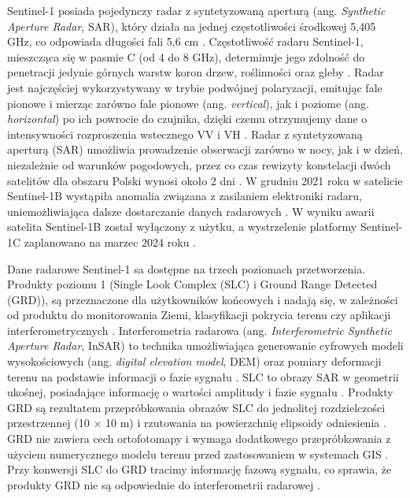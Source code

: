 \documentclass{amuthesis}
\begin{document}
Sentinel-1 posiada pojedynczy radar z syntetyzowaną aperturą (ang.
\emph{Synthetic Aperture Radar}, SAR), który działa na jednej
częstotliwości środkowej 5,405 GHz, co odpowiada długości fali 5,6 cm
\autocite{sentinel1_lulc,sentinel1_instrument_payload}. Częstotliwość
radaru Sentinel-1, mieszcząca się w pasmie C (od 4 do 8 GHz),
determinuje jego zdolność do penetracji jedynie górnych warstw koron
drzew, roślinności oraz gleby \autocite{sentinel_1_user_guide}. Radar
jest najczęściej wykorzystywany w trybie podwójnej polaryzacji, emitując
fale pionowe i mierząc zarówno fale pionowe (ang. \emph{vertical}), jak
i poziome (ang. \emph{horizontal}) po ich powrocie do czujnika, dzięki
czemu otrzymujemy dane o intensywności rozproszenia wstecznego VV i VH
\autocite{sentinel1_lulc}. Radar z syntetyzowaną aperturą (SAR)
umożliwia prowadzenie obserwacji zarówno w nocy, jak i w dzień,
niezależnie od warunków pogodowych, przez co czas rewizyty konstelacji
dwóch satelitów dla obszaru Polski wynosi około 2 dni
\autocite{attema_2008_s1,sentinel1_revisit}. W grudniu 2021 roku w
satelicie Sentinel-1B wystąpiła anomalia związana z zasilaniem
elektroniki radaru, uniemożliwiająca dalsze dostarczanie danych
radarowych \autocite{sentinel_1b}. W wyniku awarii satelita Sentinel-1B
został wyłączony z użytku, a wystrzelenie platformy Sentinel-1C
zaplanowano na marzec 2024 roku
\autocite{sentinel_1b,sentinel1_eoportal}.

Dane radarowe Sentinel-1 sa dostępne na trzech poziomach przetworzenia.
Produkty poziomu 1 (Single Look Complex (SLC) i Ground Range Detected
(GRD)), są przeznaczone dla użytkowników końcowych i nadają się, w
zależności od produktu do monitorowania Ziemi, klasyfikacji pokrycia
terenu czy aplikacji interferometrycznych
\autocite{hejmanowska_2020_dane}. Interferometria radarowa (ang.
\emph{Interferometric Synthetic Aperture Radar}, InSAR) to technika
umożliwiająca generowanie cyfrowych modeli wysokościowych (ang.
\emph{digital elevation model}, DEM) oraz pomiary deformacji terenu na
podstawie informacji o fazie sygnału
\autocite{hanssen_2001_insar,hejmanowska_2020_dane}. SLC to obrazy SAR w
geometrii ukośnej, posiadające informację o wartości amplitudy i fazie
sygnału \autocite{hejmanowska_2020_dane}. Produkty GRD są rezultatem
przepróbkowania obrazów SLC do jednolitej rozdzielczości przestrzennej
(10 × 10 m) i rzutowania na powierzchnię elipsoidy odniesienia
\autocite{hejmanowska_2020_dane}. GRD nie zawiera cech ortofotomapy i
wymaga dodatkowego przepróbkowania z użyciem numerycznego modelu terenu
przed zastosowaniem w systemach GIS \autocite{hejmanowska_2020_dane}.
Przy konwersji SLC do GRD tracimy informację fazową sygnału, co sprawia,
że produkty GRD nie są odpowiednie do interferometrii radarowej
\autocite{sentinel1_products}.
\end{document}
